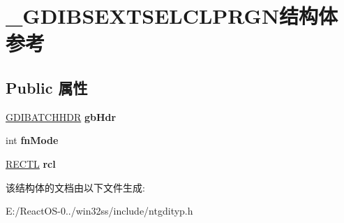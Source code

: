\hypertarget{struct___g_d_i_b_s_e_x_t_s_e_l_c_l_p_r_g_n}{}\section{\+\_\+\+G\+D\+I\+B\+S\+E\+X\+T\+S\+E\+L\+C\+L\+P\+R\+G\+N结构体 参考}
\label{struct___g_d_i_b_s_e_x_t_s_e_l_c_l_p_r_g_n}
\subsection*{Public 属性}
\begin{DoxyCompactItemize}
\item 
\mbox{\label{struct___g_d_i_b_s_e_x_t_s_e_l_c_l_p_r_g_n_a921f4d7177141d27e24c21d2f9230d36}} 
\hyperlink{struct___g_d_i_b_a_t_c_h_h_d_r}{G\+D\+I\+B\+A\+T\+C\+H\+H\+DR} {\bfseries gb\+Hdr}
\item 
\mbox{\label{struct___g_d_i_b_s_e_x_t_s_e_l_c_l_p_r_g_n_a6e21fc3ed26836de2b981f2631d38864}} 
int {\bfseries fn\+Mode}
\item 
\mbox{\label{struct___g_d_i_b_s_e_x_t_s_e_l_c_l_p_r_g_n_a6f6377862f10bc98cc2776f0f3aec196}} 
\hyperlink{struct___r_e_c_t_l}{R\+E\+C\+TL} {\bfseries rcl}
\end{DoxyCompactItemize}


该结构体的文档由以下文件生成\+:\begin{DoxyCompactItemize}
\item 
E\+:/\+React\+O\+S-\/0../win32ss/include/ntgdityp.\+h\end{DoxyCompactItemize}
